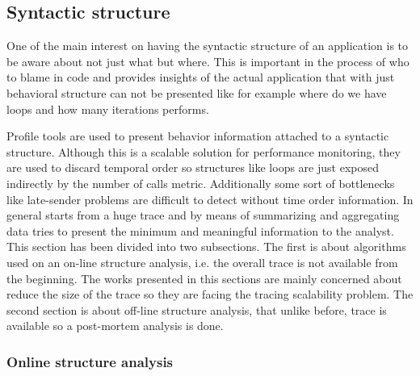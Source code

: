 \subsection{Syntactic structure}\label{ss:syntactic_structure}


One of the main interest on having the syntactic structure of an application is to be
aware about not just what but where. This is important in the process of who to
blame in code and provides insights of the actual application that with just
behavioral structure can not be presented like for example where do we have
loops and how many iterations performs.

Profile tools are used to present behavior information attached to a 
syntactic structure. Although this is a scalable
solution for performance monitoring, they are used to discard temporal order so
structures like loops are just exposed indirectly by the number of calls metric.
Additionally some sort of bottlenecks like late-sender problems are difficult to
detect without time order information. In
general starts from a huge trace and by means of summarizing and aggregating
data tries to present the minimum and meaningful information to the analyst.
This section has been divided into two subsections. The first is about
algorithms used on an on-line structure analysis, i.e. the overall trace is not 
available from the beginning.
The works presented in this sections are mainly concerned about reduce the size of the
trace so they are facing the tracing scalability problem. The second section is 
about off-line structure analysis, that unlike before, trace is available so a 
post-mortem analysis is done. 



\subsubsection{Online structure analysis}

